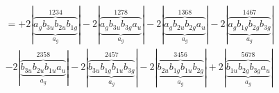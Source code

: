 \documentclass{article}
\begin{document}
\begin{multline*}
=+2\left|\underbrace{\overbrace{a_{g} b_{3u} b_{2u} b_{1g}}^{1 2 3 4}}_{a_{g}}\right|-2\left|\underbrace{\overbrace{a_{g} b_{3u} b_{3g} a_{u}}^{1 2 7 8}}_{a_{g}}\right|-2\left|\underbrace{\overbrace{a_{g} b_{2u} b_{2g} a_{u}}^{1 3 6 8}}_{a_{g}}\right|-2\left|\underbrace{\overbrace{a_{g} b_{1g} b_{2g} b_{3g}}^{1 4 6 7}}_{a_{g}}\right|\\
-2\left|\underbrace{\overbrace{b_{3u} b_{2u} b_{1u} a_{u}}^{2 3 5 8}}_{a_{g}}\right|-2\left|\underbrace{\overbrace{b_{3u} b_{1g} b_{1u} b_{3g}}^{2 4 5 7}}_{a_{g}}\right|-2\left|\underbrace{\overbrace{b_{2u} b_{1g} b_{1u} b_{2g}}^{3 4 5 6}}_{a_{g}}\right|+2\left|\underbrace{\overbrace{b_{1u} b_{2g} b_{3g} a_{u}}^{5 6 7 8}}_{a_{g}}\right|
\end{multline*}
\\\\
\end{document}
